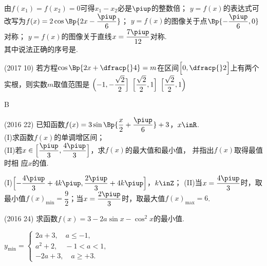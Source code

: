 \begin{exercise}
        由$f(x_1)=f(x_2)=0$可得$x_1-x_2$必是$\piup$的整数倍；
        $y=f(x)$的表达式可改写为$f(x)=2\cos\Bp{2x-\dfrac{\piup}6}$；
        $y=f(x)$的图像关于点$\Bp{-\dfrac{\piup}6,0}$对称；
        $y=f(x)$的图像关于直线$x=\dfrac{7\piup}{12}$对称.\\
        其中说法正确的序号是\tk.
        \begin{answer}
        \end{answer}
      \item%
        (2017  10)
        若方程$\cos\Bp{2x+\dfracp{}4}=m$在区间$\Bigl[0,\dfracp{}2\Bigr]$上有两个实根，则实数$m$取值范围是\xz
         {$\Bigl(-1,-\dfrac{\sqrt2}2\Bigr]$}
         {$\Bigl[\dfrac{\sqrt2}2,1\Bigr]$}
         {$\Bigl[\dfrac{\sqrt2}2,1\Bigr)$}
        \begin{answer}
          B
        \end{answer}
      \item%
        (2016  22)
        已知函数$f(x)=3\sin\Bp{\dfrac{x}2+\dfrac{\piup}6}+3$，$x\inR$.\\
        (I)求函数$f(x)$的单调增区间；\\
        (II)若$x\in\Bigl[\dfrac{\piup}3,\dfrac{4\piup}3\Bigr]$，求$f(x)$的最大值和最小值，
        并指出$f(x)$取得最值时相
        应$x$的值.
        \begin{answer}
          (I)$\Bigl[-\dfrac{4\piup}3+4k\piup,\dfrac{2\piup}3+4k\piup\Bigr]$，$k\inZ$；
          (II)当$x=\dfrac{4\piup}3$时，取最小值$f(x)_{\min}=\dfrac92$；当$x=\dfrac{2\piup}3$时，取最大值$f(x)_{\max}=6$.
        \end{answer}
      \vspace{5cm}
      \item%
        (2016  24)
        求函数$f(x)=3-2a\sin x-\cos^2x$的最小值.
        \begin{answer}
          $y_{\min}=\begin{cases}
            2a+3,\quad a\leqslant-1,\\
            a^2+2,\quad -1<a<1,\\
            -2a+3,\quad a\geqslant+3.
          \end{cases}$
        \end{answer}
      \vspace{5cm}
    \end{exercise}
